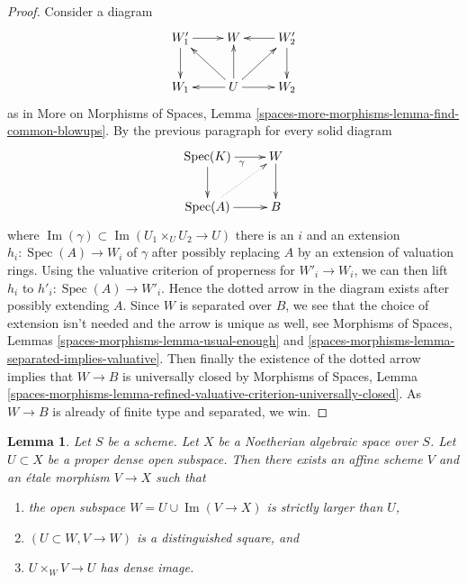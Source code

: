 \documentclass{stacks-project}
\theoremstyle{plain}
\newtheorem{lemma}[subsection]{Lemma}
\theoremstyle{definition}
\theoremstyle{remark}
\numberwithin{equation}{subsection}
\def\Spec{\mathop{\mathrm{Spec}}}
\def\Im{\mathop{\mathrm{Im}}}
\begin{document}
\begin{proof}
\medskip\noindent
Consider a diagram
$$
\xymatrix{
W_1' \ar[d] \ar[r] & W & W_2' \ar[l] \ar[d] \\
W_1 & U \ar[l] \ar[lu] \ar[u] \ar[ru] \ar[r] & W_2
}
$$
as in More on Morphisms of Spaces, Lemma
\ref{spaces-more-morphisms-lemma-find-common-blowups}.
By the previous paragraph for every solid diagram
$$
\xymatrix{
\Spec(K) \ar[r]_\gamma  \ar[d] & W \ar[d] \\
\Spec(A) \ar@{..>}[ru] \ar[r] & B
}
$$
where $\Im(\gamma) \subset \Im(U_1 \times_U U_2 \to U)$
there is an $i$ and an extension $h_i : \Spec(A) \to W_i$ of $\gamma$
after possibly replacing $A$ by an extension of valuation rings.
Using the valuative criterion of properness for $W'_i \to W_i$,
we can then lift $h_i$ to $h'_i : \Spec(A) \to W'_i$.
Hence the dotted arrow in the diagram exists after possibly
extending $A$. Since $W$ is separated over $B$, we see that the choice
of extension isn't needed and the arrow is unique as well, see
Morphisms of Spaces, Lemmas \ref{spaces-morphisms-lemma-usual-enough}
and \ref{spaces-morphisms-lemma-separated-implies-valuative}.
Then finally the existence of the dotted arrow
implies that $W \to B$ is universally closed by
Morphisms of Spaces, Lemma
\ref{spaces-morphisms-lemma-refined-valuative-criterion-universally-closed}.
As $W \to B$ is already of finite type and separated, we win.
\end{proof}

\begin{lemma}
\label{lemma-filter-Noetherian-space}
Let $S$ be a scheme. Let $X$ be a Noetherian algebraic space over $S$.
Let $U \subset X$ be a proper dense open subspace. Then there exists an
affine scheme $V$ and an \'etale morphism $V \to X$ such that
\begin{enumerate}
\item the open subspace $W = U \cup \Im(V \to X)$ is strictly larger
than $U$,
\item $(U \subset W, V \to W)$ is a distinguished square, and
\item $U \times_W V \to U$ has dense image.
\end{enumerate}
\end{lemma}
\end{document}
